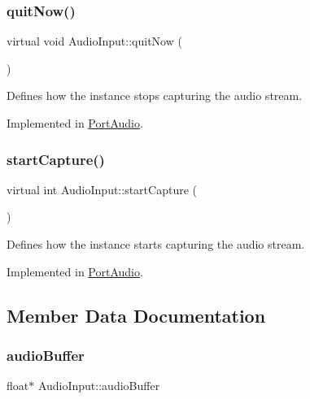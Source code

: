 \subsubsection{\texorpdfstring{quit\+Now()}{quitNow()}}
{\footnotesize\ttfamily virtual void Audio\+Input\+::quit\+Now (\begin{DoxyParamCaption}{ }\end{DoxyParamCaption})\hspace{0.3cm}{\ttfamily [pure virtual]}}

Defines how the instance stops capturing the audio stream. 

Implemented in \mbox{\hyperlink{classPortAudio_a88fc85aad0b14014b0775ec0a769ea0a}{Port\+Audio}}.

\mbox{\label{classAudioInput_afa753742035f7069f5ef0c2ece6a62fe}} 
\subsubsection{\texorpdfstring{start\+Capture()}{startCapture()}}
{\footnotesize\ttfamily virtual int Audio\+Input\+::start\+Capture (\begin{DoxyParamCaption}{ }\end{DoxyParamCaption})\hspace{0.3cm}{\ttfamily [pure virtual]}}

Defines how the instance starts capturing the audio stream. 

Implemented in \mbox{\hyperlink{classPortAudio_a2685650c8e1568f8089babd3af5f6bc1}{Port\+Audio}}.



\subsection{Member Data Documentation}
\mbox{\label{classAudioInput_a797943485896a381ea80947c8b6a8488}} 
\subsubsection{\texorpdfstring{audio\+Buffer}{audioBuffer}}
{\footnotesize\ttfamily float$\ast$ Audio\+Input\+::audio\+Buffer\hspace{0.3cm}{\ttfamily [protected]}}

